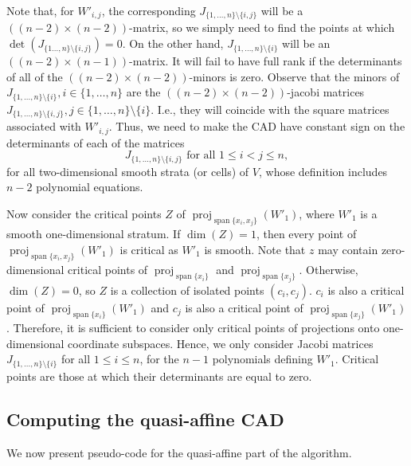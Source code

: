 \documentclass[
]{book}
\theoremstyle{definition}
\theoremstyle{definition}
\theoremstyle{definition}
\theoremstyle{definition}
\theoremstyle{remark}
\begin{document}
Note that, for \(W'_{i,j}\), the corresponding \(J_{\{1,\ldots,n\} \setminus \{i,j\}}\) will be a \(((n-2) \times (n-2))\)-matrix, so we simply need to find the points at which \(\det(J_{\{1\ldots,n\} \setminus \{i,j\}}) = 0\).
On the other hand, \(J_{\{1,\ldots,n\} \setminus \{i\}}\) will be an \(((n-2) \times (n-1))\)-matrix. It will fail to have full rank if the determinants of all of the \(((n-2) \times (n-2))\)-minors is zero. Observe that the minors of \(J_{\{1,\ldots,n\} \setminus \{i\}}, i \in \{1,\ldots,n\}\) are the \(((n-2)\times (n-2))\)-jacobi matrices \(J_{\{1,\ldots,n\} \setminus \{i,j\}}, j \in \{1,\ldots,n\} \setminus \{i\}\). I.e., they will coincide with the square matrices associated with \(W'_{i,j}\). Thus, we need to make the CAD have constant sign on the determinants of each of the matrices
\[
J_{\{1,\ldots,n\} \setminus \{i,j\}} \text{ for all } 1 \le i < j \le n,
\]
for all two-dimensional smooth strata (or cells) of \(V\), whose definition includes \(n-2\) polynomial equations.

Now consider the critical points \(Z\) of \({\operatorname{proj}_{{\operatorname{span} \{x_i,x_j\}}}}(W'_1)\), where \(W'_1\) is a smooth one-dimensional stratum. If \(\dim(Z) = 1\), then every point of \({\operatorname{proj}_{{\operatorname{span} \{x_i,x_j\}}}}(W'_1)\) is critical as \(W'_1\) is smooth. Note that \(z\) may contain zero-dimensional critical points of \({\operatorname{proj}_{{\operatorname{span} \{x_i\}}}}\) and \({\operatorname{proj}_{{\operatorname{span} \{x_j\}}}}\).
Otherwise, \(\dim(Z) = 0\), so \(Z\) is a collection of isolated points \((c_i,c_j)\). \(c_i\) is also a critical point of \({\operatorname{proj}_{{\operatorname{span} \{x_i\}}}}(W'_1)\) and \(c_j\) is also a critical point of \({\operatorname{proj}_{{\operatorname{span} \{x_j\}}}}(W'_1)\). Therefore, it is sufficient to consider only critical points of projections onto one-dimensional coordinate subspaces. Hence, we only consider Jacobi matrices
\(J_{\{1,\ldots,n\} \setminus \{i\}}\) for all \(1\le i \le n\), for the \(n-1\) polynomials defining \(W'_1\). Critical points are those at which their determinants are equal to zero.

\hypertarget{sec:quasiaffine-algorithm}{%
\subsection{Computing the quasi-affine CAD}\label{sec:quasiaffine-algorithm}}

We now present pseudo-code for the quasi-affine part of the algorithm.
\end{document}
